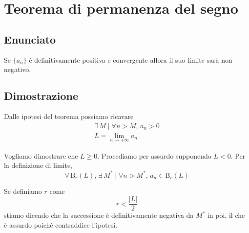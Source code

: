 \documentclass[../../dimostrazioni]{subfiles}
\begin{document}
    \chapter{Teorema di permanenza del segno}
    \label{teoPermSegno}

        \section*{Enunciato}

            Se \(\{a_n\}\) è definitivamente positiva e convergente allora il suo limite sarà non negativo.

        \section*{Dimostrazione}

            Dalle ipotesi del teorema possiamo ricavare
            \begin{gather*}
                \exists \, M \; | \; \forall n > M, \, a_n > 0\\
                L = \lim_{n \to +\infty} a_n
            \end{gather*}

            Vogliamo dimostrare che \(L \geqslant 0\). Procediamo per assurdo supponendo \(L < 0\). Per la definizione
            di limite,
            \[
                \forall \, \mathrm{B}_r (L), \, \exists \, M^* \; | \; \forall n > M^*, \, a_n \in \mathrm{B}_r (L)
            \]

            Se definiamo \(r\) come
            \[
                r < \frac{|L|}{2}
            \]
            stiamo dicendo che la successione è definitivamente negativa da \(M^*\) in poi, il che è assurdo poiché
            contraddice l'ipotesi.
    
\end{document}
